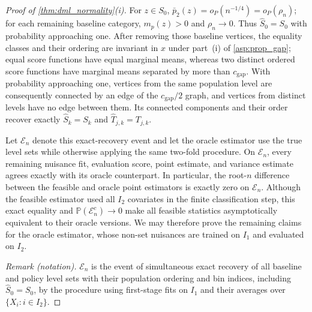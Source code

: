 \begin{proof}[Proof of \cref{thm:dml_normality}\textup{(i)}]
For $z\in S_0$, $\bar p_2(z)=o_P(n^{-1/4})=o_P(\rho_n)$; for each remaining baseline category, $m_p(z)>0$ and $\rho_n\to0$. Thus $\widehat S_0=S_0$ with probability approaching one. After removing those baseline vertices, the equality classes and their ordering are invariant in $x$ under part~\textup{(i)} of \cref{asp:prop_gap}; equal score functions have equal marginal means, whereas two distinct ordered score functions have marginal means separated by more than $c_{\mathrm{gap}}$. With probability approaching one, vertices from the same population level are consequently connected by an edge of the $c_{\mathrm{gap}}/2$ graph, and vertices from distinct levels have no edge between them. Its connected components and their order recover exactly $\widehat S_k=S_k$ and $\widehat T_{j,k}=T_{j,k}$.

Let $\mathcal E_n$ denote this exact-recovery event and let the oracle estimator use the true level sets while otherwise applying the same two-fold procedure. On $\mathcal E_n$, every remaining nuisance fit, evaluation score, point estimate, and variance estimate agrees exactly with its oracle counterpart. In particular, the root-$n$ difference between the feasible and oracle point estimators is exactly zero on $\mathcal E_n$. Although the feasible estimator used all $I_2$ covariates in the finite classification step, this exact equality and $\mathbb P(\mathcal E_n^c)\to0$ make all feasible statistics asymptotically equivalent to their oracle versions. We may therefore prove the remaining claims for the oracle estimator, whose non-set nuisances are trained on $I_1$ and evaluated on $I_2$.

\noindent\textit{Remark (notation).} $\mathcal E_n$ is the event of simultaneous exact recovery of all baseline and policy level sets with their population ordering and bin indices, including $\widehat S_0=S_0$, by the procedure using first-stage fits on $I_1$ and their averages over $\{X_i:i\in I_2\}$.



\end{proof}
